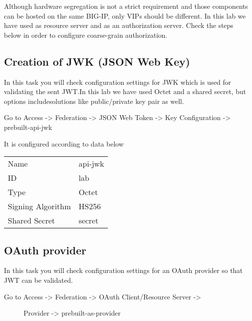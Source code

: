 \documentclass[letterpaper,10pt,english]{sphinxmanual}
\begin{document}
Although hardware segregation is not a strict requirement and those components can be hosted on the same BIG-IP, only VIPs should be different. In this lab we have used   as resource server and  as an authorization server.
Check the steps below in order to configure coarse-grain authorization.


\subsection{Creation of JWK (JSON Web Key)}
\label{\detokenize{class2/module1/module1:creation-of-jwk-json-web-key}}
In this task you will check configuration settings for JWK which is used for validating the sent JWT.In this lab we have used Octet and a shared secret, but options includesolutions like public/private key pair as well.

Go to Access -\textgreater{} Federation -\textgreater{} JSON Web Token -\textgreater{} Key Configuration -\textgreater{} prebuilt-api-jwk

It is configured according to data below


\begin{savenotes}\sphinxattablestart
\centering
\begin{tabulary}{\linewidth}[t]{|T|T|}
\hline
{}\relax &\relax \\
\hline
Name
&
api-jwk
\\
\hline
ID
&
lab
\\
\hline
Type
&
Octet
\\
\hline
Signing Algorithm
&
HS256
\\
\hline
Shared Secret
&
secret
\\
\hline
\end{tabulary}
\par
\sphinxattableend\end{savenotes}


\subsection{OAuth provider}
\label{\detokenize{class2/module1/module1:oauth-provider}}
In this task you will check configuration settings for an OAuth provider so that JWT can be validated.
\begin{description}
\item[{Go to Access -\textgreater{} Federation -\textgreater{} OAuth Client/Resource Server -\textgreater{}}] \leavevmode
Provider -\textgreater{} prebuilt-as-provider

\end{description}
\end{document}
